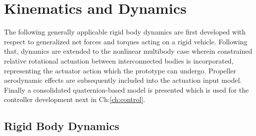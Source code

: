 \chapter{Kinematics and Dynamics}
\label{ch:dynamics}
The following generally applicable rigid body dynamics are first developed with respect to generalized net forces and torques acting on a rigid vehicle. Following that, dynamics are extended to the nonlinear multibody case wherein constrained relative rotational actuation between interconnected bodies is incorporated, representing the actuator action which the prototype can undergo. Propeller aerodynamic effects are subsequently included into the actuation input model. Finally a consolidated quaternion-based model is presented which is used for the controller development next in Ch:\ref{ch:control}.
\section{Rigid Body Dynamics}
\label{sec:dynamics.rigidbody}
